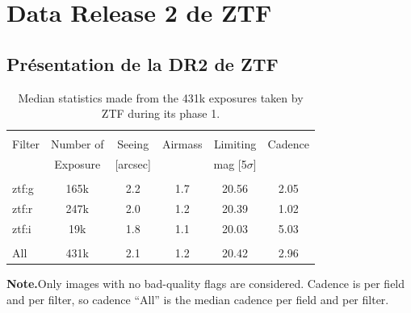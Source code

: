 \documentclass[../main/main.tex]{subfiles}
\begin{document}
\dominitoc
\faketableofcontents
\setcounter{chapter}{8}
\chapter{Data Release 2 de ZTF}\label{ch:res}

\minitoc
\newpage

\section{Présentation de la DR2 de ZTF}


\begin{table}
  \scriptsize
  \centerfloat
  \setlength\tabcolsep{14pt}
  \renewcommand{\arraystretch}{1.2}
  \begin{threeparttable}

    \caption{Median statistics made from the 431k exposures taken by ZTF during its phase 1.}
    \label{tab:summary_systematics}
    \begin{tabular}{l c c c c c}
      \hline\\[-0.5em]
      \hline\\[-0.5em]
      Filter  & Number of & Seeing & Airmass & Limiting & Cadence\\[0.15em]
              & Exposure & [arcsec] &  & mag [5$\sigma$] &  \\[0.15em]
      \hline\\[-0.5em]
      ztf:g   & 165k & 2.2 & 1.7 & 20.56 & 2.05\\[0.30em]
      ztf:r   & 247k & 2.0 & 1.2 & 20.39 & 1.02\\[0.30em]
      ztf:i   & 19k & 1.8 & 1.1 & 20.03 & 5.03\\[0.30em]
      \hline\\[-0.5em]
      All & 431k & 2.1 & 1.2 & 20.42 & 2.96\\[0.30em]
    \end{tabular}
    \begin{tablenotes}[flushleft]
    \item \textbf{Note.}Only images with no bad-quality flags are considered. 
      Cadence is per field and per filter, so cadence “All” is the
      median cadence per field and per filter.
    \end{tablenotes}
  \end{threeparttable}
\end{table}
    
\end{document}
